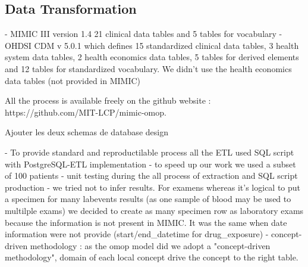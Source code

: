 \subsection{Data Transformation}
- MIMIC III version 1.4 21 clinical data tables and 5 tables for vocabulary
- OHDSI CDM v 5.0.1 which defines 15 standardized clinical data tables, 3 health system data tables, 2 health economics data tables, 5 tables for derived elements and 12 tables for standardized vocabulary. 
  We didn’t use the health economics data tables (not provided in MIMIC)

All the process is available freely on the github website : https://github.com/MIT-LCP/mimic-omop.

Ajouter les deux schemas de database design

- To provide standard and reproductilable process all the ETL used SQL script
  with PostgreSQL-ETL implementation
- to speed up our work we used a subset of 100 patients
- unit testing during the all process of extraction and SQL script production
- we tried  not to infer results. For examens whereas it's logical to put a
  specimen for many labevents results (as one sample of blood may be used to
  multilple exams) we decided to create as many specimen row as laboratory
  exams because the information is not present in MIMIC. It was the same when
  date information were not provide (start/end_datetime for drug_exposure)
- concept-driven methodology : as the omop model did we adopt a "concept-driven
  methodology", domain of each local concept drive the concept to the right
  table.

